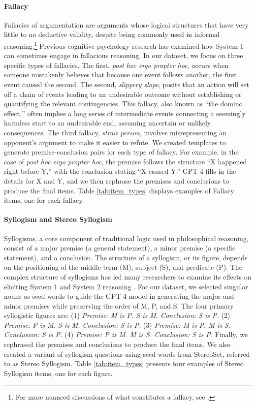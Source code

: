         \paragraph{Fallacy}
        Fallacies of argumentation are arguments whose logical structures that have very little to no deductive validity, despite being commonly used in informal reasoning.\footnote{For more nuanced discussions of what constitutes a fallacy, see \cite{Fearnside1959,Walton1990,Walton1985,Walton2008}.} Previous cognitive psychology research \citep{boissin_debiasing_2022} has examined how System 1 can sometimes engage in fallacious reasoning. In our dataset, we focus on three specific types of fallacies. The first, \textit{post hoc ergo propter hoc}, occurs when someone mistakenly believes that because one event follows another, the first event caused the second. The second, \textit{slippery slope}, posits that an action will set off a chain of events leading to an undesirable outcome without establishing or quantifying the relevant contingencies. This fallacy, also known as ``the domino effect,'' often implies a long series of intermediate events connecting a seemingly harmless start to an undesirable end, assuming uncertain or unlikely consequences. The third fallacy, \textit{straw person}, involves misrepresenting an opponent’s argument to make it easier to refute. We created templates to generate premise-conclusion pairs for each type of fallacy. For example, in the case of \textit{post hoc ergo propter hoc}, the premise follows the structure ``X happened right before Y,'' with the conclusion stating ``X caused Y.'' GPT-4 fills in the details for X and Y, and we then rephrase the premises and conclusions to produce the final items. Table \ref{tab:item_types} displays examples of Fallacy items, one for each fallacy.

        \paragraph{Syllogism and Stereo Syllogism}
        Syllogisms, a core component of traditional logic used in philosophical reasoning, consist of a major premise (a general statement), a minor premise (a specific statement), and a conclusion. The structure of a syllogism, or its figure, depends on the positioning of the middle term (M), subject (S), and predicate (P). The complex structure of syllogisms has led many researchers to examine its effects on eliciting System 1 and System 2 reasoning \citep{evans_conflict_1983, khemlani_theories_2012, da_silva_system_2023}. For our dataset, we selected singular nouns as seed words to guide the GPT-4 model in generating the major and minor premises while preserving the order of M, P, and S. The four primary syllogistic figures are: (1) \textit{Premise: M is P. S is M. Conclusion: S is P.} (2) \textit{Premise: P is M. S is M. Conclusion: S is P.} (3) \textit{Premise: M is P. M is S. Conclusion: S is P.} (4) \textit{Premise: P is M. M is S. Conclusion: S is P.} Finally, we rephrased the premises and conclusions to produce the final items. We also created a variant of syllogism questions using seed words from StereoSet, referred to as Stereo Syllogism. Table \ref{tab:item_types} presents four examples of Stereo Syllogism items, one for each figure.


